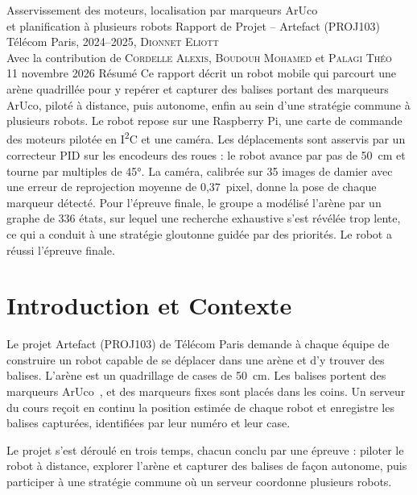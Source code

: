 \newcommand{\langue}{french}


{Asservissement des moteurs, localisation par marqueurs ArUco\\ et planification à plusieurs robots}
{Rapport de Projet -- Artefact (PROJ103)}
{Télécom Paris, 2024--2025, \textsc{Dionnet Eliott}\\
Avec la contribution de \textsc{Cordelle Alexis}, \textsc{Boudouh Mohamed} et \textsc{Palagi Théo}\\
11 novembre 2026}
{Résumé}
{Ce rapport décrit un robot mobile qui parcourt une arène quadrillée pour y repérer et capturer des balises
portant des marqueurs ArUco, piloté à distance, puis autonome, enfin au sein d'une stratégie commune à
plusieurs robots. Le robot repose sur une Raspberry Pi, une carte de commande des moteurs pilotée en I\textsuperscript{2}C et
une caméra. Les déplacements sont asservis par un correcteur PID sur les encodeurs des roues : le robot avance
par pas de 50~cm et tourne par multiples de 45°. La caméra, calibrée sur 35 images de damier avec une erreur
de reprojection moyenne de 0,37~pixel, donne la pose de chaque marqueur détecté. Pour l'épreuve finale, le
groupe a modélisé l'arène par un graphe de 336 états, sur lequel une recherche exhaustive s'est révélée trop
lente, ce qui a conduit à une stratégie gloutonne guidée par des priorités. Le robot a réussi l'épreuve finale.}

\section{Introduction et Contexte}
Le projet Artefact (PROJ103) de Télécom Paris demande à chaque équipe de construire un robot capable
de se déplacer dans une arène et d'y trouver des balises.
L'arène est un quadrillage de cases de 50~cm. Les balises
portent des marqueurs ArUco~\cite{aruco}, et des marqueurs fixes
sont placés dans les coins. Un serveur du cours reçoit en
continu la position estimée de chaque robot et enregistre
les balises capturées, identifiées par leur numéro et leur case.

Le projet s'est déroulé en trois temps, chacun conclu
par une épreuve : piloter le robot à distance, explorer
l'arène et capturer des balises de façon autonome, puis
participer à une stratégie commune où un serveur coordonne plusieurs robots.

